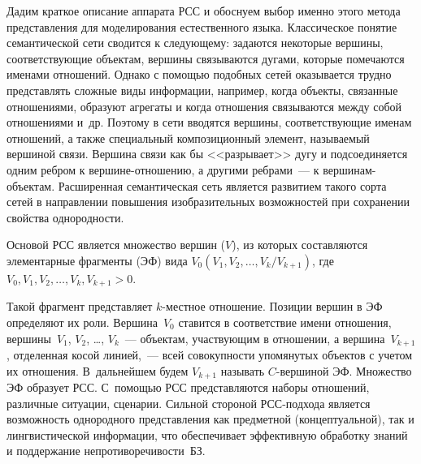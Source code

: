 \begin{multicols}{2}
     Дадим краткое описание аппарата РСС и  
обос\-ну\-ем выбор именно этого метода представления для моделирования 
естественного языка. Классическое понятие семантической сети сводится к 
следующему: задаются некоторые вершины, соответствующие объектам,  
вершины связываются дугами, которые помечаются именами отношений. 
Однако с помощью подобных сетей оказывается трудно представлять 
сложные виды информации, например, когда объекты, связанные 
отношениями, образуют агрегаты и когда отношения связываются между 
собой отношениями и~др. Поэтому в сети вводятся вершины, 
соответствующие именам отношений, а также специальный композиционный 
элемент, называемый вершиной связи. Вершина связи как бы <<разрывает>> 
дугу и подсоединяется одним ребром к вершине-отношению, а другими 
ребрами~--- к вершинам-объектам. Расширенная семантическая сеть является развитием такого сорта 
сетей в направлении повышения изобразительных возможностей при 
сохранении свойства однородности.
     
     Основой РСС является множество вершин ($V$), из которых 
составляются элементарные фрагменты (ЭФ) вида
     $
     V_0(V_1,V_2,\ldots ,V_k/V_{k+1})
     $, 
     где
$V_0, V_1, V_2,\ldots , V_k, V_{k+1}>0$.
     
     
     Такой фрагмент представляет $k$-местное отношение. Позиции 
вершин в ЭФ определяют их роли. 
Вершина~$V_0$ ставится в соответствие имени отношения, 
вершины~$V_1$, $V_2$, \ldots , $V_k$~--- объектам, участ\-ву\-ющим в 
отношении, а вершина~$V_{k+1}$, отделенная косой линией,~--- всей 
совокупности упомянутых объектов с учетом их отношения. В~дальнейшем 
будем $V_{k+1}$ называть $C$-вершиной ЭФ.\linebreak 
Множество ЭФ образует РСС. 
С~помощью РСС представляются наборы отношений, различные ситуации, 
сце\-нарии. Сильной стороной РСС-под\-хо\-да является возможность 
однородного пред\-став\-ле\-ния как предметной (концептуальной), так и 
лингвистической информации, что обеспечивает эффективную обработку 
знаний и поддержание непротиворечи\-вости~БЗ.
          \begin{figure*} %
     \vspace*{1pt}
\begin{center}
\mbox{%
\epsfxsize=125.039mm
}
\end{center}
\vspace*{-9pt}
\vspace*{12pt}
           \vspace*{1pt}
\begin{center}
\mbox{%
\epsfxsize=103.129mm
}
\end{center}
\vspace*{-9pt}
      \end{figure*}


\end{multicols}
